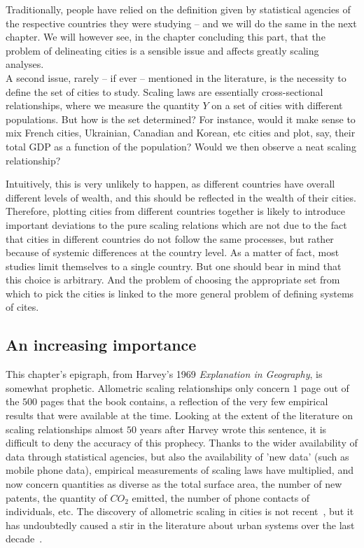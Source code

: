 Traditionally, people have relied on the definition given by statistical
agencies of the respective countries they were studying -- and we will do the
same in the next chapter. We will however see, in the chapter concluding this
part, that the problem of delineating cities is a sensible issue and affects
greatly scaling analyses. \\


A second issue, rarely -- if ever -- mentioned in the literature, is the
necessity to define the set of cities to study. Scaling laws are essentially
cross-sectional relationships, where we measure the quantity $Y$ on a set of
cities with different populations. But how is the set determined? For instance,
would it make sense to mix French cities, Ukrainian, Canadian and Korean, etc
cities and plot, say, their total GDP as a function of the population? Would we
then observe a neat scaling relationship? 

Intuitively, this is very unlikely to happen, as different countries have
overall different levels of wealth, and this should be reflected in the wealth
of their cities. Therefore, plotting cities from different countries together is
likely to introduce important deviations to the pure scaling relations which are
not due to the fact that cities in different countries do not follow the same
processes, but rather because of systemic differences at the country level. As a
matter of fact, most studies limit themselves to a single country. But one should
bear in mind that this choice is arbitrary. And the problem of choosing
the appropriate set from which to pick the cities is linked to the more general
problem of defining systems of cites.


\subsection{An increasing importance}
\label{sub:an_increasing_place_in_the_landscape}


This chapter's epigraph, from Harvey's 1969
\emph{Explanation in Geography}, is somewhat prophetic.  Allometric scaling
relationships only concern $1$ page out of the $500$ pages that the book
contains, a reflection of the very few empirical results that were available at
the time.  Looking at the extent of the literature on scaling relationships
almost $50$ years after Harvey wrote this sentence, it is difficult to deny the
accuracy of this prophecy. Thanks to the wider availability of data through
statistical agencies, but also the availability of 'new data' (such as mobile
phone data), empirical measurements of scaling laws have multiplied, and now
concern quantities as diverse as the total surface area, the number of new patents,
the quantity of $CO_2$ emitted, the number of phone contacts of individuals, etc. 
The discovery of allometric scaling in cities is not recent~\cite{Stewart:1947},
but it has undoubtedly caused a stir in the literature about urban systems over
the last
decade~\cite{Bettencourt:2007,Pumain:2004,Bettencourt:2013,Louf:2014_scaling,Louf:2014_smog,Arcaute:2014}.\\



